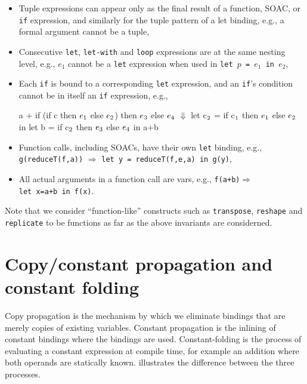 \begin{itemize}
\item Tuple expressions can appear only as the final result of a
  function, SOAC, or \texttt{if} expression, and similarly for the
  tuple pattern of a let binding, e.g., a formal argument cannot be a
  tuple,
\item Consecutive \texttt{let}, \texttt{let-with} and \texttt{loop}
  expressions are at the same nesting level, e.g., $e_1$ cannot be a
  \texttt{let} expression when used in
  \texttt{let~$p$~=~$e_1$~in~$e_2$},
\item Each \texttt{if} is bound to a corresponding \texttt{let}
  expression, and an \texttt{if}'s condition cannot be in itself an
  \texttt{if} expression, e.g.,
\begin{center}
\begin{colorcode}
a + if (if c then \(e_{1}\) else \(e_{2}\))
    then \(e_{3}\)
    else \(e_{4}\)
  \(\Downarrow\)
let c\(_{2}\) = if c\(_{1}\) then \(e_{1}\) else \(e_{2}\) in
let b = if c\(_{2}\) then \(e_{3}\) else \(e_{4}\) in a+b
\end{colorcode}
\end{center}
\item Function calls, including SOACs, have their own \texttt{let}
  binding, e.g., \texttt{g(reduceT(f,a))} $\Rightarrow$
  \texttt{let~y~=~reduceT(f,e,a)~in~g(y)},
\item All actual arguments in a function call are vars, e.g.,
  \texttt{f(a+b)}$\Rightarrow$\texttt{let~x=a+b~in~f(x)}.
\end{itemize}

Note that we consider ``function-like'' constructs such as
\texttt{transpose}, \texttt{reshape} and \texttt{replicate} to be
functions as far as the above invariants are considerned.

\section{Copy/constant propagation and constant folding}
\label{sec:copyconstpropfold}

Copy propagation is the mechanism by which we eliminate bindings that
are merely copies of existing variables.  Constant propagation is the
inlining of constant bindings where the bindings are
used. Constant-folding is the process of evaluating a constant
expression at compile time, for example an addition where both
operands are statically known.
 illustrates the
difference between the three processes.


